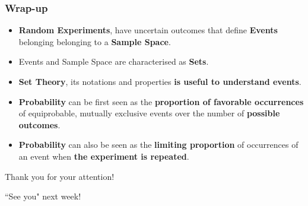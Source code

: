 \documentclass[notes=show]{beamer}\usepackage[]{graphicx}\usepackage[]{color}
\begin{document}
\begin{frame}
\frametitle{Wrap-up}

  \begin{itemize}
  \item \textbf{Random Experiments}, have uncertain outcomes that define \textbf{Events} belonging  belonging to a \textbf{Sample Space}.
  \item Events and Sample Space are characterised as \textbf{Sets}.
  \item \textbf{Set Theory}, its notations and properties \textbf{is useful to understand events}.
  \item \textbf{Probability} can be first seen as the \textbf{proportion of favorable occurrences} of equiprobable, mutually exclusive events over the number of \textbf{possible outcomes}.
  \item \textbf{Probability} can also be seen as the \textbf{limiting proportion} of occurrences of an event when \textbf{the experiment is repeated}.
  \end{itemize}
\end{frame}


\begin{frame}
	\begin{center}

		\LARGE{Thank you for your attention!}

		\pause

		\LARGE{``See you" next week!}
	\end{center}
\end{frame}
\end{document}
